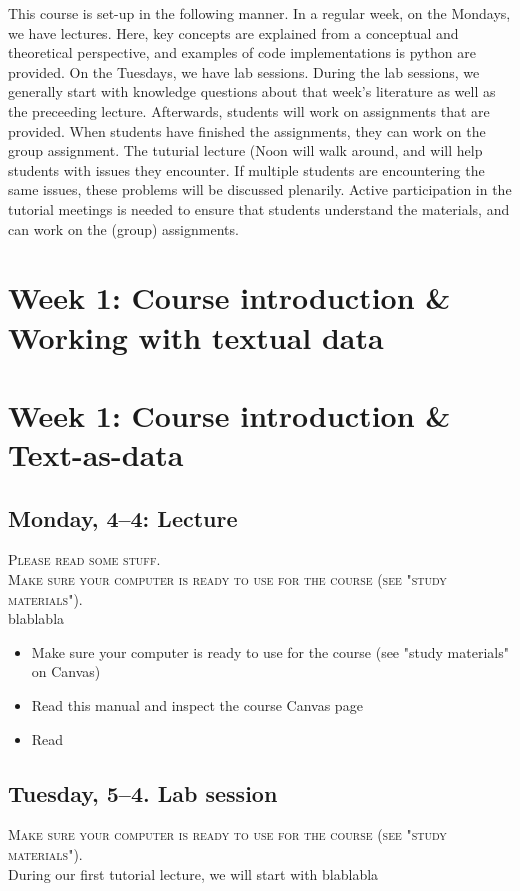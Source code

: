 This course is set-up in the following manner. In a regular week, on the Mondays, we have lectures. Here, key concepts are explained from a conceptual and theoretical perspective, and examples of code implementations is python are provided.  On the Tuesdays, we have lab sessions. During the lab sessions, we generally start with knowledge questions about that week's literature as well as the preceeding lecture. Afterwards, students will work on assignments that are provided. When students have finished the assignments, they can work on the group assignment. The tuturial lecture (Noon will walk around, and will help students with issues they encounter. If multiple students are encountering the same issues, these problems will be discussed plenarily. Active participation in the tutorial meetings is needed to ensure that students understand the materials, and can work on the (group) assignments.

\section*{Week 1: Course introduction \& Working with textual data}



\section*{Week 1: Course introduction \& Text-as-data}


\subsection*{Monday, 4--4: Lecture}
\textsc{ Please read some stuff.}\\
\textsc{ Make sure your computer is ready to use for the course (see "study materials").}\\
blablabla

\begin{itemize}
	\item{Make sure your computer is ready to use for the course (see "study materials" on Canvas)}
	\item{Read this manual and inspect the course Canvas page}
	\item{Read \cite{boumans_taking_2016}}
\end{itemize}


\subsection*{Tuesday, 5--4. Lab session}
\textsc{ Make sure your computer is ready to use for the course (see "study materials").}\\
During our first tutorial lecture, we will start with blablabla

